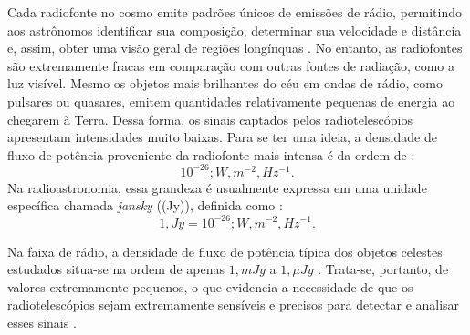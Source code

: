 Cada radiofonte no cosmo emite padrões únicos de emissões de rádio, permitindo aos astrônomos identificar sua composição, determinar sua velocidade e distância e, assim, obter uma visão geral de regiões longínquas \cite{libretexts_radio_reflecting_telescope}. No entanto, as radiofontes são extremamente fracas em comparação com outras fontes de radiação, como a luz visível. Mesmo os objetos mais brilhantes do céu em ondas de rádio, como pulsares ou quasares, emitem quantidades relativamente pequenas de energia ao chegarem à Terra. Dessa forma, os sinais captados pelos radiotelescópios apresentam intensidades muito baixas. Para se ter uma ideia, a densidade de fluxo de potência proveniente da radiofonte mais intensa é da ordem de \cite{radioastronomia_text_intro, cheng2009telescope_Desing}:
\[
10^{-26} ; W , m^{-2} , Hz^{-1}.
\]
Na radioastronomia, essa grandeza é usualmente expressa em uma unidade específica chamada \textit{jansky} ((Jy)), definida como \cite{cheng2009telescope_Desing}:
\begin{equation}
1 , Jy = 10^{-26} ; W , m^{-2} , Hz^{-1}.
\end{equation}


Na faixa de rádio, a densidade de fluxo de potência típica dos objetos celestes estudados situa-se na ordem de apenas \(1 , mJy \) a \(1 , \mu Jy \) \cite{cheng2009telescope_Desing}. Trata-se, portanto, de valores extremamente pequenos, o que evidencia a necessidade de que os radiotelescópios sejam extremamente sensíveis e precisos para detectar e analisar esses sinais \cite{radioastronomia_text_intro}.


